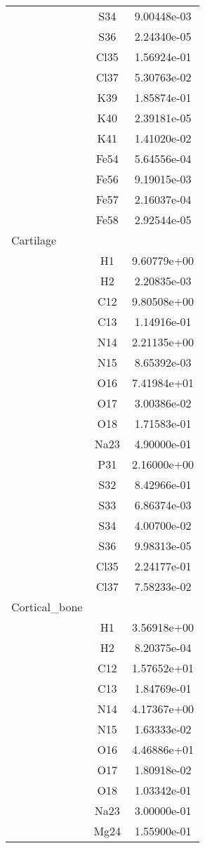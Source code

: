 \begin{centering}
\begin{longtable}{l c c}
& S34 & 9.00448e-03 \\ 
& S36 & 2.24340e-05 \\ 
& Cl35 & 1.56924e-01 \\ 
& Cl37 & 5.30763e-02 \\ 
& K39 & 1.85874e-01 \\ 
& K40 & 2.39181e-05 \\ 
& K41 & 1.41020e-02 \\ 
& Fe54 & 5.64556e-04 \\ 
& Fe56 & 9.19015e-03 \\ 
& Fe57 & 2.16037e-04 \\ 
& Fe58 & 2.92544e-05 \\ 
\hline
Cartilage & & \\
\hline
& H1 & 9.60779e+00 \\ 
& H2 & 2.20835e-03 \\ 
& C12 & 9.80508e+00 \\ 
& C13 & 1.14916e-01 \\ 
& N14 & 2.21135e+00 \\ 
& N15 & 8.65392e-03 \\ 
& O16 & 7.41984e+01 \\ 
& O17 & 3.00386e-02 \\ 
& O18 & 1.71583e-01 \\ 
& Na23 & 4.90000e-01 \\ 
& P31 & 2.16000e+00 \\ 
& S32 & 8.42966e-01 \\ 
& S33 & 6.86374e-03 \\ 
& S34 & 4.00700e-02 \\ 
& S36 & 9.98313e-05 \\ 
& Cl35 & 2.24177e-01 \\ 
& Cl37 & 7.58233e-02 \\ 
\hline
Cortical\_bone & & \\
\hline
& H1 & 3.56918e+00 \\ 
& H2 & 8.20375e-04 \\ 
& C12 & 1.57652e+01 \\ 
& C13 & 1.84769e-01 \\ 
& N14 & 4.17367e+00 \\ 
& N15 & 1.63333e-02 \\ 
& O16 & 4.46886e+01 \\ 
& O17 & 1.80918e-02 \\ 
& O18 & 1.03342e-01 \\ 
& Na23 & 3.00000e-01 \\ 
& Mg24 & 1.55900e-01 \\ 

\end{longtable}
\end{centering}
